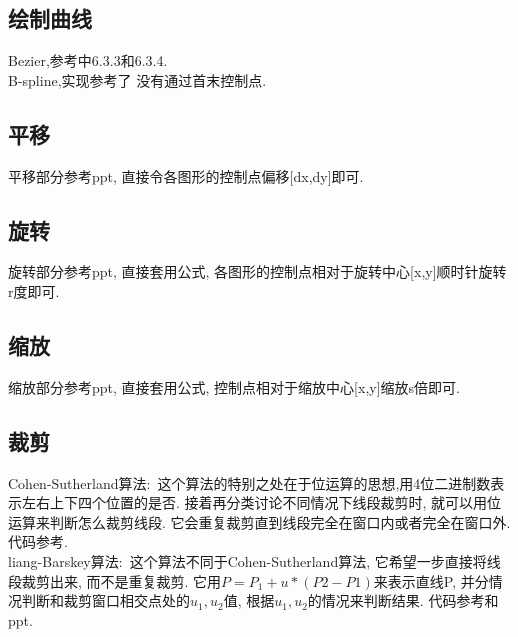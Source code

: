 \documentclass[a4paper,UTF8]{article}
\theoremstyle{definition}
\begin{document}
\subsection{绘制曲线}
\indent Bezier,参考\cite{sun_2006}中6.3.3和6.3.4.\\
\indent B-spline,实现参考了\cite{bspline_web} 没有通过首末控制点.\\

\subsection{平移}
\indent 平移部分参考ppt, 直接令各图形的控制点偏移[dx,dy]即可.\\

\subsection{旋转}
\indent 旋转部分参考ppt, 直接套用公式, 各图形的控制点相对于旋转中心[x,y]顺时针旋转r度即可.

\subsection{缩放}
\indent 缩放部分参考ppt, 直接套用公式, 控制点相对于缩放中心[x,y]缩放s倍即可.

\subsection{裁剪}
\indent Cohen-Sutherland算法:\ 这个算法的特别之处在于位运算的思想,用4位二进制数表示左右上下四个位置的是否. 接着再分类讨论不同情况下线段裁剪时, 就可以用位运算来判断怎么裁剪线段. 它会重复裁剪直到线段完全在窗口内或者完全在窗口外.
代码参考\cite{cohen_web}.\\
\indent liang-Barskey算法:\ 这个算法不同于Cohen-Sutherland算法, 它希望一步直接将线段裁剪出来, 而不是重复裁剪.
它用$P=P_1+u*(P2-P1)$来表示直线P, 并分情况判断和裁剪窗口相交点处的$u_1,u_2$值, 根据$u_1,u_2$的情况来判断结果.
代码参考\cite{liang_web}和ppt.\\
\end{document}
